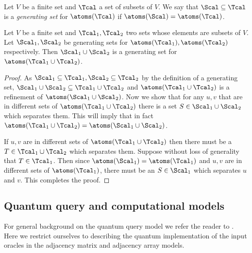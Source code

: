 \begin{definition}
Let $V$ be a finite set and $\Tcal$ a set of subsets of $V$.  We say that $\Scal \subseteq \Tcal$ is a \emph{generating set} for 
$\atoms(\Tcal)$ if $\atoms(\Scal) = \atoms(\Tcal)$.
\end{definition}

\begin{proposition}
\label{prop:atom_cup}
Let $V$ be a finite set and $\Tcal_1, \Tcal_2$ two sets whose elements are subsets of $V$.  Let $\Scal_1, \Scal_2$ be generating sets 
for $\atoms(\Tcal_1), \atoms(\Tcal_2)$ respectively.  Then $\Scal_1 \cup \Scal_2$ is a generating set for $\atoms(\Tcal_1 \cup \Tcal_2)$.
\end{proposition}

\begin{proof}
As $\Scal_1 \subseteq \Tcal_1, \Scal_2 \subseteq \Tcal_2$ by the definition of a generating set,
$\Scal_1 \cup \Scal_2 \subseteq \Tcal_1 \cup \Tcal_2$ and $\atoms(\Tcal_1 \cup \Tcal_2)$ is a refinement of $\atoms(\Scal_1 \cup \Scal_2)$.  
Now we show that for any $u,v$ that are in different sets of $\atoms(\Tcal_1 \cup \Tcal_2)$ there is a set $S \in \Scal_1 \cup \Scal_2$ which 
separates them.  This will imply that in fact $\atoms(\Tcal_1 \cup \Tcal_2) = \atoms(\Scal_1 \cup \Scal_2)$.

If $u,v$ are in different sets of $\atoms(\Tcal_1 \cup \Tcal_2)$ then there must be a $T \in \Tcal_1 \cup \Tcal_2$ which separates them.  Suppose 
without loss of generality that $T \in \Tcal_1$.  Then since $\atoms(\Scal_1) = \atoms(\Tcal_1)$ and $u,v$ are in different sets of $\atoms(\Tcal_1)$, 
there must be an $S \in \Scal_1$ which separates $u$ and $v$.  This completes the proof.
\end{proof}

\subsection{Quantum query and computational models}
For general background on the quantum query model we refer the reader to \cite{HLS07}. 
Here we restrict ourselves to describing the quantum 
implementation of the input oracles in the adjacency matrix and adjacency array models.

